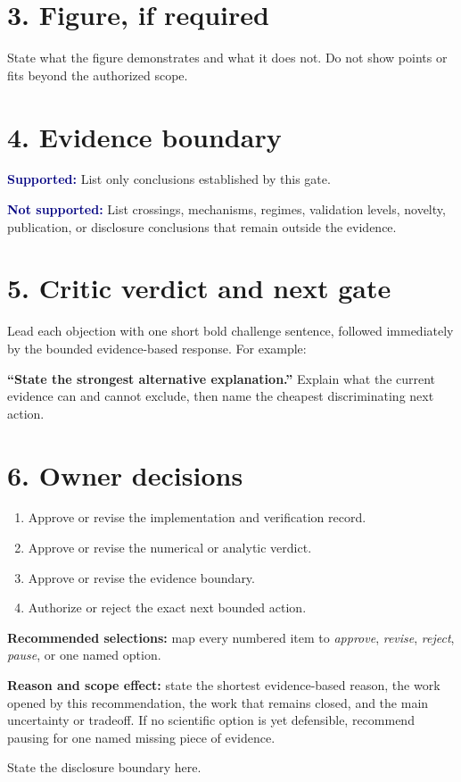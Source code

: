 \documentclass[11pt]{article}
\newcommand{\supported}[1]{\textcolor{navy}{\textbf{Supported:}} #1}
\newcommand{\notsupported}[1]{\textcolor{navy}{\textbf{Not supported:}} #1}
\begin{document}
\clearpage
\section*{3. Figure, if required}
\thispagestyle{fancy}


State what the figure demonstrates and what it does not. Do not show points or
fits beyond the authorized scope.

\section*{4. Evidence boundary}

\supported{List only conclusions established by this gate.}

\notsupported{List crossings, mechanisms, regimes, validation levels, novelty,
publication, or disclosure conclusions that remain outside the evidence.}

\clearpage
\section*{5. Critic verdict and next gate}
\thispagestyle{fancy}

Lead each objection with one short bold challenge sentence, followed
immediately by the bounded evidence-based response. For example:

\textbf{``State the strongest alternative explanation.''} Explain what the
current evidence can and cannot exclude, then name the cheapest discriminating
next action.

\section*{6. Owner decisions}

\begin{enumerate}[itemsep=5pt,leftmargin=2em]
\item Approve or revise the implementation and verification record.
\item Approve or revise the numerical or analytic verdict.
\item Approve or revise the evidence boundary.
\item Authorize or reject the exact next bounded action.
\end{enumerate}

\textbf{Recommended selections:} map every numbered item to \emph{approve},
\emph{revise}, \emph{reject}, \emph{pause}, or one named option.

\textbf{Reason and scope effect:} state the shortest evidence-based reason,
the work opened by this recommendation, the work that remains closed, and the
main uncertainty or tradeoff. If no scientific option is yet defensible,
recommend pausing for one named missing piece of evidence.

\vfill
\begin{center}
\small State the disclosure boundary here.
\end{center}
\end{document}
